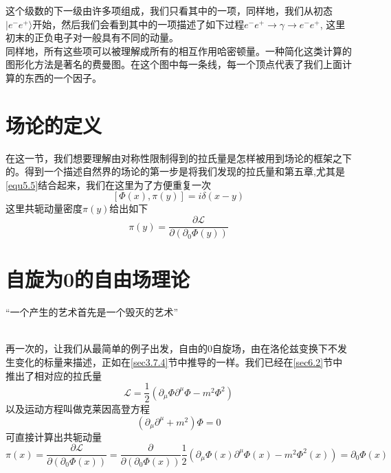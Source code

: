 这个级数的下一级由许多项组成，我们只看其中的一项，同样地，我们从初态$|e^{-}e^{+} \rangle$开始，然后我们会看到其中的一项描述了如下过程$e^{-}e^{+} \to \gamma \to e^{-}e^{+}$, 这里初末的正负电子对一般具有不同的动量。\\

同样地，所有这些项可以被理解成所有的相互作用哈密顿量。一种简化这类计算的图形化方法是著名的费曼图。在这个图中每一条线，每一个顶点代表了我们上面计算的东西的一个因子。

\section{场论的定义}
在这一节，我们想要理解由对称性限制得到的拉氏量是怎样被用到场论的框架之下的。得到一个描述自然界的场论的第一步是将我们发现的拉氏量和第五章,尤其是\ref{equ5.5}结合起来，我们在这里为了方便重复一次
\begin{equation} \label{equ9.1}
[\Phi(x),\pi(y)]=i\delta(x-y)
\end{equation}
这里共轭动量密度$\pi(y)$给出如下
\begin{equation} \label{equ9.2}
\pi(y)=\frac{\partial \mathscr{L}}{\partial(\partial_{0}\Phi(y))}
\end{equation}
\section{自旋为0的自由场理论}
{\small “一个产生的艺术首先是一个毁灭的艺术”\\}\\\par
再一次的，让我们从最简单的例子出发，自由的0自旋场，由在洛伦兹变换下不发生变化的标量来描述，正如在\ref{sec3.7.4}节中推导的一样。我们已经在\ref{sec6.2}节中推出了相对应的拉氏量
\begin{equation} \label{equ9.3}
\mathscr{L}=\frac{1}{2}(\partial_{\mu}\Phi \partial^{\mu}\Phi-m^{2}\Phi^{2})
\end{equation}
以及运动方程叫做克莱因高登方程
\begin{equation} \label{equ9.4}
(\partial_{\mu}\partial^{\mu}+m^{2})\Phi=0
\end{equation}
可直接计算出共轭动量
$$\pi(x)=\frac{\partial \mathscr{L}}{\partial( \partial_{0}\Phi(x))}=\frac{\partial}{\partial(\partial_{0}\Phi(x))} \frac{1}{2}(\partial_{\mu}\Phi(x)\partial^{\mu}\Phi(x)-m^{2}\Phi^{2}(x))=\partial_{0}\Phi(x)$$

